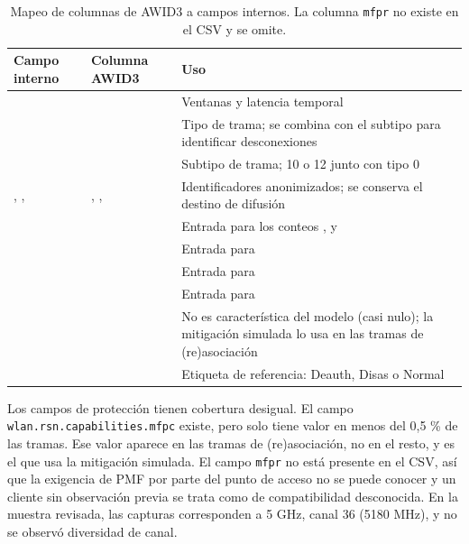 \documentclass[journal]{IEEEtran}
\begin{document}
\begin{table}[t]
\caption{Mapeo de columnas de AWID3 a campos internos. La columna \texttt{mfpr} no existe en el CSV y se omite.}
\label{tab:mapeo}
\centering
\footnotesize
\begin{tabularx}{\textwidth}{p{2.6cm}p{6.2cm}Y}
\hline
Campo interno & Columna AWID3 & Uso \\
\hline
{} &  & Ventanas y latencia temporal \\
 &  & Tipo de trama; se combina con el subtipo para identificar desconexiones \\
 &  & Subtipo de trama; 10 o 12 junto con tipo 0 \\
, ,  & , ,  & Identificadores anonimizados; se conserva el destino de difusión \\
 &  & Entrada para los conteos ,  y  \\
 &  & Entrada para  \\
 &  & Entrada para  \\
 &  & Entrada para  \\
 &  & No es característica del modelo (casi nulo); la mitigación simulada lo usa en las tramas de (re)asociación \\
 &  & Etiqueta de referencia: Deauth, Disas o Normal \\
\hline
\end{tabularx}
\end{table}

Los campos de protección tienen cobertura desigual. El campo \texttt{wlan.rsn.capabilities.mfpc} existe, pero solo tiene valor en menos del 0,5 \% de las tramas. Ese valor aparece en las tramas de (re)asociación, no en el resto, y es el que usa la mitigación simulada. El campo \texttt{mfpr} no está presente en el CSV, así que la exigencia de PMF por parte del punto de acceso no se puede conocer y un cliente sin observación previa se trata como de compatibilidad desconocida. En la muestra revisada, las capturas corresponden a 5 GHz, canal 36 (5180 MHz), y no se observó diversidad de canal.
\end{document}
